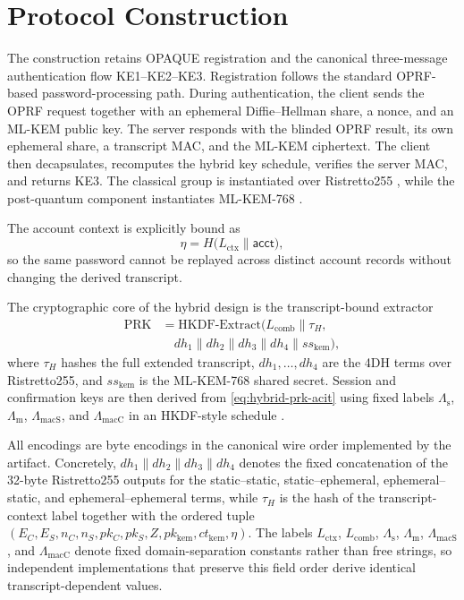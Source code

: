\documentclass[conference]{IEEEtran}
\newcommand{\acct}{\mathsf{acct}}
\newcommand{\Label}[1]{L_{\mathrm{#1}}}
\newcommand{\KLabel}[1]{\Lambda_{\mathrm{#1}}}
\begin{document}
\section{Protocol Construction}

The construction retains OPAQUE registration and the canonical three-message authentication flow KE1--KE2--KE3. Registration follows the standard OPRF-based password-processing path. During authentication, the client sends the OPRF request together with an ephemeral Diffie--Hellman share, a nonce, and an ML-KEM public key. The server responds with the blinded OPRF result, its own ephemeral share, a transcript MAC, and the ML-KEM ciphertext. The client then decapsulates, recomputes the hybrid key schedule, verifies the server MAC, and returns KE3. The classical group is instantiated over Ristretto255 \cite{devalence2024}, while the post-quantum component instantiates ML-KEM-768 \cite{fips203}.

The account context is explicitly bound as
\begin{equation}
\eta = H\!\bigl(\Label{ctx} \| \acct\bigr),
\label{eq:acct-context-acit}
\end{equation}
so the same password cannot be replayed across distinct account records without changing the derived transcript.

The cryptographic core of the hybrid design is the transcript-bound extractor
\begin{equation}
\begin{aligned}
\mathrm{PRK} &=
\mathrm{HKDF\text{-}Extract}\!\bigl(
\Label{comb} \| \tau_H, \\
&\quad dh_1 \| dh_2 \| dh_3 \| dh_4 \| ss_{\mathrm{kem}}
\bigr),
\end{aligned}
\label{eq:hybrid-prk-acit}
\end{equation}
where $\tau_H$ hashes the full extended transcript, $dh_1,\dots,dh_4$ are the 4DH terms over Ristretto255, and $ss_{\mathrm{kem}}$ is the ML-KEM-768 shared secret. Session and confirmation keys are then derived from \eqref{eq:hybrid-prk-acit} using fixed labels $\KLabel{s}$, $\KLabel{m}$, $\KLabel{macS}$, and $\KLabel{macC}$ in an HKDF-style schedule \cite{krawczyk2010}.

All encodings are byte encodings in the canonical wire order implemented by the artifact. Concretely, $dh_1 \| dh_2 \| dh_3 \| dh_4$ denotes the fixed concatenation of the 32-byte Ristretto255 outputs for the static--static, static--ephemeral, ephemeral--static, and ephemeral--ephemeral terms, while $\tau_H$ is the hash of the transcript-context label together with the ordered tuple $(E_C,E_S,n_C,n_S,pk_C,pk_S,Z,pk_{\mathrm{kem}},ct_{\mathrm{kem}},\eta)$. The labels $\Label{ctx}$, $\Label{comb}$, $\KLabel{s}$, $\KLabel{m}$, $\KLabel{macS}$, and $\KLabel{macC}$ denote fixed domain-separation constants rather than free strings, so independent implementations that preserve this field order derive identical transcript-dependent values.
\end{document}
